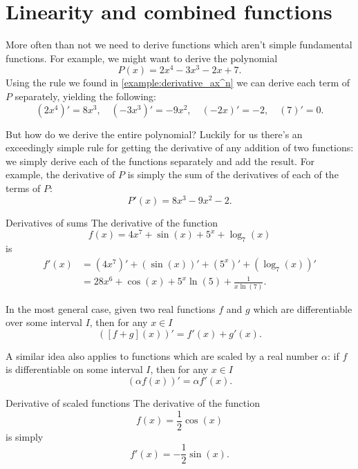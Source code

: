 \section{Linearity and combined functions}
\label{sec:linearity_of_the_derivative}

More often than not we need to derive functions which aren't simple fundamental functions. For example, we might want to derive the polynomial
\[
  P(x)=2x^{4}-3x^{3}-2x+7.
\]
Using the rule we found in \autoref{example:derivative_ax^n} we can derive each term of $P$ separately, yielding the following:
\[
  \left(2x^{4}\right)'=8x^{3},\quad \left(-3x^{3}\right)'=-9x^{2},\quad \left(-2x\right)'=-2,\quad \left(7\right)'=0.
\]

But how do we derive the entire polynomial? Luckily for us there's an exceedingly simple rule for getting the derivative of any addition of two functions: we simply derive each of the functions separately and add the result. For example, the derivative of $P$ is simply the sum of the derivatives of each of the terms of $P$:
\[
  P'(x) = 8x^{3}-9x^{2}-2.
\]

\begin{example}{Derivatives of sums}{}
  The derivative of the function
  \[
    f(x) = 4x^{7} + \sin(x) + 5^{x} + \log_{7}(x)
  \]
  is
  \begin{align*}
    f'(x) &= \left(4x^{7}\right)' + \left(\sin(x)\right)' + \left(5^{x}\right)' + \left(\log_{7}(x)\right)'\\
          &= 28x^{6} + \cos(x) + 5^{x}\ln(5) + \frac{1}{x\ln(7)}.
  \end{align*}
\end{example}

In the most general case, given two real functions $f$ and $g$ which are differentiable over some interval $I$, then for any $x\in I$
\begin{equation}
  \left(\left[f+g\right](x)\right)' = f'(x)+g'(x).
  \label{eq:derivative_additivity}
\end{equation}

A similar idea also applies to functions which are scaled by a real number $\alpha$: if $f$ is differentiable on some interval $I$, then for any $x\in I$
\begin{equation}
  \left(\alpha f(x)\right)' = \alpha f'(x).
  \label{eq:derivative_scalability}
\end{equation}

\begin{example}{Derivative of scaled functions}{}
  The derivative of the function
  \[
    f(x) = \frac{1}{2}\cos(x)
  \]
  is simply
  \[
    f'(x) = -\frac{1}{2}\sin(x).
  \]
\end{example}

